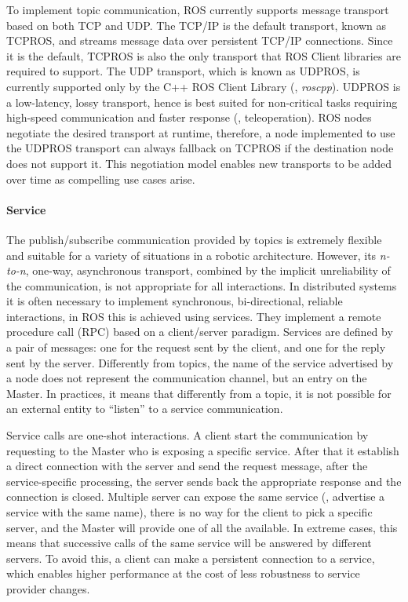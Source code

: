 To implement topic communication, ROS currently supports message transport based on both TCP and UDP. The TCP/IP is the default transport, known as TCPROS, and streams message data over persistent TCP/IP connections. Since it is the default, TCPROS is also the only transport that ROS Client libraries are required to support. The UDP transport, which is known as UDPROS, is currently supported only by the C++ ROS Client Library (\ie, \textit{roscpp}). UDPROS is a low-latency, lossy transport, hence is best suited for non-critical tasks requiring high-speed communication and faster response (\eg, teleoperation). ROS nodes negotiate the desired transport at runtime, therefore, a node implemented to use the UDPROS transport can always fallback on TCPROS if the destination node does not support it. This negotiation model enables new transports to be added over time as compelling use cases arise. 

\paragraph{Service} The publish/subscribe communication provided by topics is extremely flexible and suitable for a variety of situations in a robotic architecture. However, its \textit{n-to-n}, one-way, asynchronous transport, combined by the implicit unreliability of the communication, is not appropriate for all interactions. In distributed systems it is often necessary to implement synchronous, bi-directional, reliable interactions, in ROS this is achieved using services. They implement a remote procedure call (RPC) based on a client/server paradigm. Services are defined by a pair of messages: one for the request sent by the client, and one for the reply sent by the server. Differently from topics, the name of the service advertised by a node does not represent the communication channel, but an entry on the Master. In practices, it means that differently from a topic, it is not possible for an external entity to ``listen'' to a service communication.

Service calls are one-shot interactions. A client start the communication by requesting to the Master who is exposing a specific service. After that it establish a direct connection with the server and send the request message, after the service-specific processing, the server sends back the appropriate response and the connection is closed. Multiple server can expose the same service (\ie, advertise a service with the same name), there is no way for the client to pick a specific server, and the Master will provide one of all the available. In extreme cases, this means that successive calls of the same service will be answered by different servers. To avoid this, a client can make a persistent connection to a service, which enables higher performance at the cost of less robustness to service provider changes.

